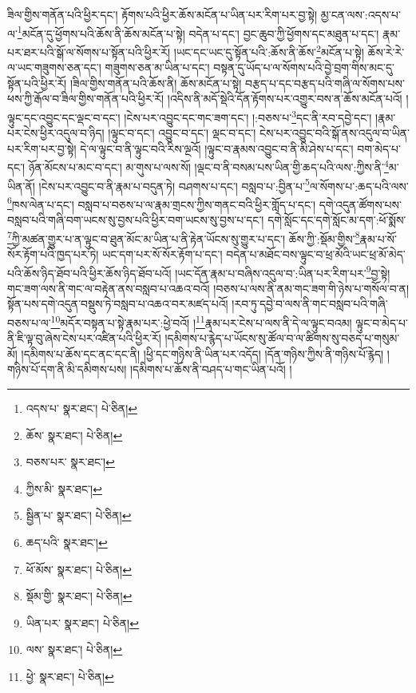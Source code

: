 ཟིལ་གྱིས་གནོན་པའི་ཕྱིར་དང་། རྟོགས་པའི་ཕྱིར་ཆོས་མངོན་པ་ཡིན་པར་རིག་པར་བྱ་སྟེ། མྱ་ངན་ལས་:འདས་པ་ལ་\footnote{འདས་པ་  སྣར་ཐང་།  པེ་ཅིན། }མངོན་དུ་ཕྱོགས་པའི་ཆོས་ནི་ཆོས་མངོན་པ་སྟེ། བདེན་པ་དང་། བྱང་ཆུབ་ཀྱི་ཕྱོགས་དང་མཐུན་པ་དང་། རྣམ་པར་ཐར་པའི་སྒོ་ལ་སོགས་པ་སྟོན་པའི་ཕྱིར་རོ། །ཡང་དང་ཡང་དུ་སྟོན་པའི་:ཆོས་ནི་ཆོས་\footnote{ཆོས་  སྣར་ཐང་།  པེ་ཅིན། }མངོན་པ་སྟེ། ཆོས་རེ་རེ་ལ་ཡང་གཟུགས་ཅན་དང་། གཟུགས་ཅན་མ་ཡིན་པ་དང་། བསྟན་དུ་ཡོད་པ་ལ་སོགས་པའི་བྱེ་བྲག་གིས་མང་དུ་སྟོན་པའི་ཕྱིར་རོ། །ཟིལ་གྱིས་གནོན་པའི་ཆོས་ནི། ཆོས་མངོན་པ་སྟེ། བརྩད་པ་དང་བརྩད་པའི་གཞི་ལ་སོགས་པས་ཕས་ཀྱི་རྒོལ་བ་ཟིལ་གྱིས་གནོན་པའི་ཕྱིར་རོ། །འདིས་ནི་མདོ་སྡེའི་དོན་རྟོགས་པར་འགྱུར་བས་ན་ཆོས་མངོན་པའོ། །ལྟུང་དང་འབྱུང་དང་ལྡང་བ་དང་། །ངེས་པར་འབྱུང་དང་གང་ཟག་དང་། །:བཅས་པ་\footnote{བཅས་པར་  སྣར་ཐང་། }དང་ནི་རབ་དབྱེ་དང་། །རྣམ་པར་ངེས་ཕྱིར་འདུལ་བ་ཉིད། །ལྟུང་བ་དང་། འབྱུང་བ་དང་། ལྡང་བ་དང་། ངེས་པར་འབྱུང་བའི་སྒོ་ནས་འདུལ་བ་ཡིན་པར་རིག་པར་བྱ་སྟེ། དེ་ལ་ལྟུང་བ་ནི་ལྟུང་བའི་རིས་ལྔའོ། །ལྟུང་བ་རྣམས་འབྱུང་བ་ནི་མི་ཤེས་པ་དང་། བག་མེད་པ་དང་། ཉོན་མོངས་པ་མང་བ་དང་། མ་གུས་པ་ལས་སོ། །ལྡང་བ་ནི་བསམ་པས་ཡིན་གྱི་ཆད་པའི་ལས་:ཀྱིས་ནི་\footnote{ཀྱིས་མི་  སྣར་ཐང་། }མ་ཡིན་ནོ། །ངེས་པར་འབྱུང་བ་ནི་རྣམ་པ་བདུན་ཏེ། བཤགས་པ་དང་། བསླབ་པ་:བྱིན་པ་\footnote{སྦྱིན་པ་  སྣར་ཐང་།  པེ་ཅིན། }ལ་སོགས་པ་:ཆད་པའི་ལས་\footnote{ཆད་པའི་  སྣར་ཐང་། }ཁས་ལེན་པ་དང་། བསླབ་པ་བཅས་པ་ལ་རྣམ་གྲངས་ཀྱིས་གནང་བའི་ཕྱིར་གློད་པ་དང་། དགེ་འདུན་ཚོགས་པས་བསླབ་པའི་གཞི་བག་ཡངས་སུ་བྱས་པའི་ཕྱིར་བག་ཡངས་སུ་བྱས་པ་དང་། དགེ་སློང་དང་དགེ་སློང་མ་དག་:ཕོ་སྨོས་\footnote{ཕོ་མོས་  སྣར་ཐང་།  པེ་ཅིན། }ཀྱི་མཚན་གྱུར་པ་ན་ལྟུང་བ་ཐུན་མོང་མ་ཡིན་པ་ནི་རྟེན་ཡོངས་སུ་གྱུར་པ་དང་། ཆོས་ཀྱི་:སྡོམ་གྱིས་\footnote{སྡོམ་གྱི་  སྣར་ཐང་།  པེ་ཅིན། }རྣམ་པ་སོ་སོར་རྟོག་པའི་ཁྱད་པར་ཏེ། ཡང་དག་པར་སོ་སོར་རྟོག་པ་དང་། བདེན་པ་མཐོང་བས་ལྟུང་བ་ཕྲ་མོའི་ཡང་ཕྲ་མོ་མེད་པའི་ཆོས་ཉིད་ཐོབ་པའི་ཕྱིར་ཆོས་ཉིད་ཐོབ་པའོ། །ཡང་དོན་རྣམ་པ་བཞིས་འདུལ་བ་:ཡིན་པར་རིག་པར་\footnote{ཡིན་པར་  སྣར་ཐང་།  པེ་ཅིན། }བྱ་སྟེ། གང་ཟག་ལས་ནི་གང་ལ་བརྟེན་ནས་བསླབ་པ་འཆའ་བའོ། །བཅས་པ་ལས་ནི་ནམ་གང་ཟག་གི་ཉེས་པ་གསོལ་བ་ན། སྟོན་པས་དགེ་འདུན་བསྡུས་ཏེ་བསླབ་པ་འཆའ་བར་མཛད་པའོ། །རབ་ཏུ་དབྱེ་བ་ལས་ནི་གང་བསླབ་པའི་གཞི་བཅས་པ་ལ་\footnote{ལས་  སྣར་ཐང་།  པེ་ཅིན། }མདོར་བསྟན་པ་སྟེ་རྣམ་པར་:ཕྱེ་བའོ། །\footnote{ཕྱེ་  སྣར་ཐང་།  པེ་ཅིན། }རྣམ་པར་ངེས་པ་ལས་ནི་དེ་ལ་ལྟུང་བའམ། ལྟུང་བ་མེད་པ་ནི་ཇི་ལྟ་བུ་ཞེས་ངེས་པར་འཛིན་པའི་ཕྱིར་རོ། །དམིགས་པ་རྙེད་པ་ཡོངས་སུ་ཚོལ་བ་ལ་ཚིགས་སུ་བཅད་པ་གསུམ་མོ། །དམིགས་པ་ཆོས་དང་ནང་དང་ནི། །ཕྱི་དང་གཉིས་ནི་ཡིན་པར་འདོད། །དོན་གཉིས་ཀྱིས་ནི་གཉིས་པོ་རྙེད། །གཉིས་པོ་དག་ནི་མི་དམིགས་པས། །དམིགས་པ་ཆོས་ནི་བཤད་པ་གང་ཡིན་པའོ། །
